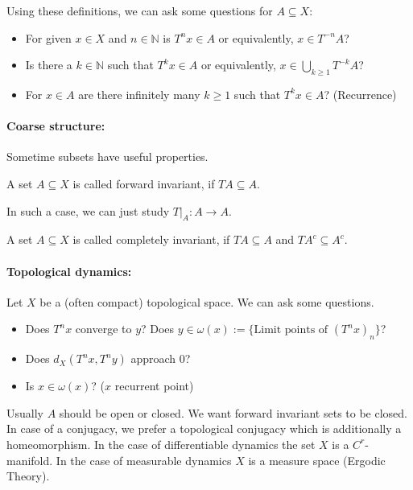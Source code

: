 \documentclass{article}
\newcommand*{\N}{\mathbb{N}}
\begin{document}
Using these definitions, we can ask some questions for $A\subseteq X$:

\begin{itemize}
    \item For given $x\in X$ and $n\in\N$ is $T^nx \in A$ or equivalently, $x \in T^{-n}A$?

    \item Is there a $k\in\N$ such that $T^kx\in A$ or equivalently, $x \in \bigcup_{k\geq 1}T^{-k}A$?

    \item For $x \in A$ are there infinitely many $k\geq1$ such that $T^kx\in A$? (Recurrence)
\end{itemize}

\paragraph{Coarse structure:}

Sometime subsets have useful properties.

\begin{defin}
    A set $A\subseteq X$ is called forward invariant, if $TA\subseteq A$.
\end{defin}

In such a case, we can just study $T|_A:A\to A$.

\begin{defin}
    A set $A\subseteq X$ is called completely invariant, if $TA\subseteq A$ and $TA^c\subseteq A^c$.
\end{defin}

\paragraph{Topological dynamics:}
Let $X$ be a (often compact) topological space. We can ask some questions.

\begin{itemize}
    \item Does $T^nx$ converge to $y$? Does $y\in \omega(x):=\{\text{Limit points of } (T^nx)_n\}$?

    \item Does $d_X(T^nx,T^ny)$ approach $0$?

    \item Is $x\in\omega(x)$? ($x$ recurrent point)
\end{itemize}
Usually $A$ should be open or closed. We want forward invariant sets to be closed.
In case of a conjugacy, we prefer a topological conjugacy which is additionally a homeomorphism. In the case of differentiable dynamics the set $X$ is a $C^r$-manifold. In the case of measurable dynamics $X$ is a measure space (Ergodic Theory).
\end{document}
